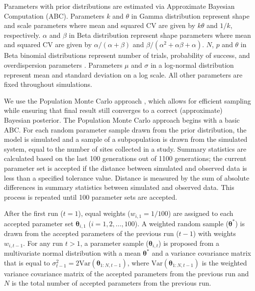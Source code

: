 \documentclass{article}\usepackage[]{graphicx}\usepackage[]{color}
\begin{document}
{\begin{landscape}
\begin{table}[h]
{Parameters with prior distributions are estimated via Approximate Bayesian Computation (ABC).
Parameters $k$ and $\theta$ in Gamma distribution represent shape and scale parameters where mean and squared CV are given by $k \theta$ and $1/k$, respectively.
$\alpha$ and $\beta$ in Beta distribution represent shape parameters where mean and squared CV are given by $\alpha/(\alpha+\beta)$ and $\beta/(\alpha^2 + \alpha \beta + \alpha)$.
$N$, $p$ and $\theta$ in Beta binomial distributions represent number of trials, probability of success, and overdispersion parameters \citep{morris1983natural}.
Parameters $\mu$ and $\sigma$ in a log-normal distribution represent mean and standard deviation on a log scale.
All other parameters are fixed throughout simulations.
}
\label{tb:param}
\end{table}
\end{landscape}
}

We use the Population Monte Carlo approach \citep{turner2012tutorial}, which allows for efficient sampling while ensuring that final result still converges to a correct (approximate) Bayesian posterior.
The Population Monte Carlo approach begins with a basic ABC.
For each random parameter sample drawn from the prior distribution, the model is simulated and a sample of a subpopulation is drawn from the simulated system, equal to the number of sites collected in a study.
Summary statistics are calculated based on the last 100 generations out of 1100 generations; the current parameter set is accepted if the distance between simulated and observed data is less than a specified tolerance value.
Distance is measured by the sum of absolute differences in summary statistics between simulated and observed data. This process is repeated until 100 parameter sets are accepted.

After the first run ($t=1$), equal weights ($w_{i,1}=1/100$) are assigned to each accepted parameter set $\bm\theta_{i, 1}$ ($i = 1, 2, \dots, 100$).
A weighted random sample ($\bm\theta^\ast$) is drawn from the accepted parameters of the previous run ($t-1$) with weights $w_{i,t-1}$.
For any run $t > 1$, a parameter sample ($\bm\theta_{i, t}$) is proposed from a multivariate normal distribution with a mean $\bm\theta^\ast$ and a variance covariance matrix that is equal to $\sigma_{t-1}^2=2 \mathrm{Var}(\bm\theta_{1:N, t-1})$, where $\mathrm{Var}(\bm\theta_{1:N, t-1})$ is the weighted variance covariance matrix of the accepted parameters from the previous run and $N$ is the total number of accepted parameters from the previous run.
\end{document}
